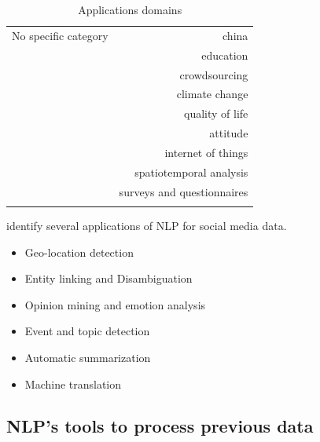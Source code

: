 \begin{center}
\begin{longtable}{ rr }
        \hline
        No specific category  & china                           \\
                              & education                       \\
                              & crowdsourcing                   \\
                              & climate change                  \\
                              & quality of life                 \\
                              & attitude                        \\
                              & internet of things              \\
                              & spatiotemporal analysis         \\
                              & surveys and questionnaires      \\
        \hline
        \caption{Applications domains}
        \label{table:application-domains}
    \end{longtable}
\end{center}

\cite{farzindarNaturalLanguageProcessing2017} identify several applications of NLP for social media data.
\begin{itemize}
    \item Geo-location detection
    \item Entity linking and Disambiguation
    \item Opinion mining and emotion analysis
    \item Event and topic detection
    \item Automatic summarization
    \item Machine translation
\end{itemize}

\subsection{NLP's tools to process previous data}

